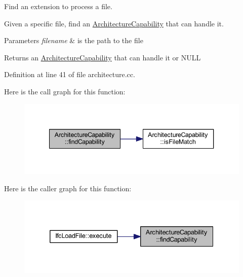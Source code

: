 Find an extension to process a file. 

Given a specific file, find an \mbox{\hyperlink{class_architecture_capability}{Architecture\+Capability}} that can handle it. 
\begin{DoxyParams}{Parameters}
{\em filename} & is the path to the file \\
\hline
\end{DoxyParams}
\begin{DoxyReturn}{Returns}
an \mbox{\hyperlink{class_architecture_capability}{Architecture\+Capability}} that can handle it or N\+U\+LL 
\end{DoxyReturn}


Definition at line 41 of file architecture.\+cc.

Here is the call graph for this function\+:
\nopagebreak
\begin{figure}[H]
\begin{center}
\leavevmode
\includegraphics[width=340pt]{class_architecture_capability_a0150ffd9a1532fc394f75f67662b7cae_cgraph}
\end{center}
\end{figure}
Here is the caller graph for this function\+:
\nopagebreak
\begin{figure}[H]
\begin{center}
\leavevmode
\includegraphics[width=332pt]{class_architecture_capability_a0150ffd9a1532fc394f75f67662b7cae_icgraph}
\end{center}
\end{figure}
\mbox{\label{class_architecture_capability_ac85f63c6e2e12e2f37f239cd5399ad42}} 
